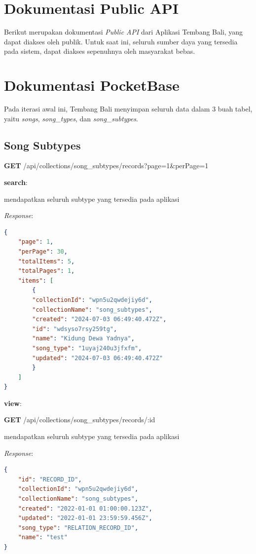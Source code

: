 \documentclass[a4paper, 12pt]{article}
\begin{document}
\section{Dokumentasi Public API}
Berikut merupakan dokumentasi \textit{Public API} dari Aplikasi Tembang Bali, yang dapat diakses oleh publik. Untuk saat ini, seluruh sumber daya yang tersedia pada sistem, dapat diakses sepenuhnya oleh masyarakat bebas.\


\section{Dokumentasi PocketBase}
Pada iterasi awal ini, Tembang Bali menyimpan seluruh data dalam 3 buah tabel, yaitu \textit{songs}, \textit{song\_types}, dan \textit{song\_subtypes}.

\subsection*{Song Subtypes}
\textbf{GET} /api/collections/song\_subtypes/records?page=1\&perPage=1

\textbf{search}:

\indent mendapatkan seluruh subtype yang tersedia pada aplikasi

\textit{Response}:
\begin{lstlisting}[language=json,firstnumber=1]
{
    "page": 1,
    "perPage": 30,
    "totalItems": 5,
    "totalPages": 1,
    "items": [
        {
        "collectionId": "wpn5u2qwdejiy6d",
        "collectionName": "song_subtypes",
        "created": "2024-07-03 06:49:40.472Z",
        "id": "wdsyso7rsy259tg",
        "name": "Kidung Dewa Yadnya",
        "song_type": "1uyaj240u3jfxfm",
        "updated": "2024-07-03 06:49:40.472Z"
        }
    ]
}
        \end{lstlisting}

\textbf{view}:

\textbf{GET} /api/collections/song\_subtypes/records/:id

\indent mendapatkan seluruh subtype  yang tersedia pada aplikasi

\textit{Response}:
\begin{lstlisting}[language=json,firstnumber=1]
{
    "id": "RECORD_ID",
    "collectionId": "wpn5u2qwdejiy6d",
    "collectionName": "song_subtypes",
    "created": "2022-01-01 01:00:00.123Z",
    "updated": "2022-01-01 23:59:59.456Z",
    "song_type": "RELATION_RECORD_ID",
    "name": "test"
}
\end{lstlisting}
\end{document}
